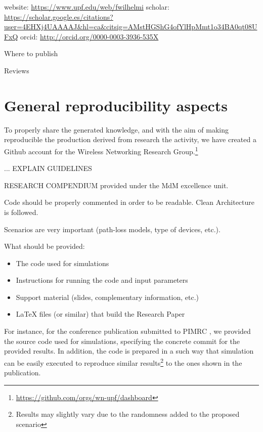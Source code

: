 \documentclass[12pt, a4paper,twoside]{article}
\begin{document}
	website: \url{https://www.upf.edu/web/fwilhelmi}
	scholar: \url{https://scholar.google.es/citations?user=4EHXj4UAAAAJ&hl=ca&citsig=AMstHGShG4ofYlHpMmt1o34BA0qt08UFxQ}
	orcid: \url{http://orcid.org/0000-0003-3936-535X}
		
	Where to publish
	
	Reviews
	
	\section{General reproducibility aspects }
	\label{section:reproducibility}		
	To properly share the generated knowledge, and with the aim of making reproducible the production derived from research the activity, we have created a Github account for the Wireless Networking Research Group.\footnote{\url{https://github.com/orgs/wn-upf/dashboard}}
	
	... EXPLAIN GUIDELINES
	
	RESEARCH COMPENDIUM provided under the MdM excellence unit.
			
	Code should be properly commented in order to be readable. Clean Architecture is followed.	
	
	Scenarios are very important (path-loss models, type of devices, etc.).
		
	What should be provided:
	\begin{itemize}
		\item The code used for simulations
		\item Instructions for running the code and input parameters 
		\item Support material (slides, complementary information, etc.)
		\item LaTeX files (or similar) that build the Research Paper
	\end{itemize}		
			
	For instance, for the conference publication submitted to PIMRC \cite{wilhelmi2017implications}, we provided the source code used for simulations, specifying the concrete commit for the provided results. In addition, the code is prepared in a such way that simulation can be easily executed to reproduce similar results\footnote{Results may slightly vary due to the randomness added to the proposed scenario} to the ones shown in the publication.
	
\end{document}
